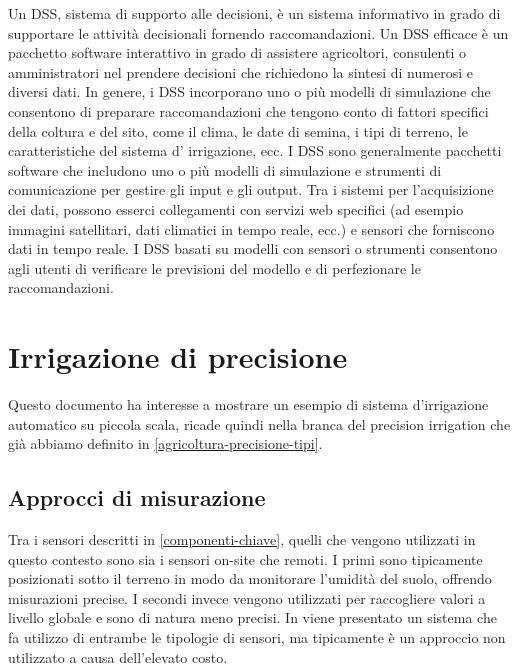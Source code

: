 \documentclass[12pt,a4paper,openright,twoside]{book}
\begin{document}
Un \ac{DSS}, sistema di supporto alle decisioni, è un sistema informativo in grado di supportare le attività decisionali fornendo raccomandazioni. Un \ac{DSS} efficace è un pacchetto software interattivo in grado di assistere agricoltori, consulenti o amministratori nel prendere decisioni che richiedono la sintesi di numerosi e diversi dati. In genere, i DSS incorporano uno o più modelli di simulazione che consentono di preparare raccomandazioni che tengono conto di fattori specifici della coltura e del sito, come il clima, le date di semina, i tipi di terreno, le caratteristiche del sistema d' irrigazione, ecc. I DSS sono generalmente pacchetti software che includono uno o più modelli di simulazione e strumenti di comunicazione per gestire gli input e gli output. Tra i sistemi per l'acquisizione dei dati, possono esserci collegamenti con servizi web specifici (ad esempio immagini satellitari, dati climatici in tempo reale, ecc.) e sensori che forniscono dati in tempo reale. I DSS basati su modelli con sensori o strumenti consentono agli utenti di verificare le previsioni del modello e di perfezionare le raccomandazioni\cite{GALLARDO2020106209}.
\newpage

\section{Irrigazione di precisione}
\label{irrigazione-di-precisione}

Questo documento ha interesse a mostrare un esempio di sistema d'irrigazione automatico su piccola scala, ricade quindi nella branca del precision irrigation che già abbiamo definito in \cref{agricoltura-precisione-tipi}.




\subsection{Approcci di misurazione}\label{approcci-misurazione}

Tra i sensori descritti in \cref{componenti-chiave}, quelli che vengono utilizzati in questo contesto sono sia i sensori on-site che remoti.
I primi sono tipicamente posizionati sotto il terreno in modo da monitorare l'umidità del suolo, offrendo misurazioni precise.
I secondi invece vengono utilizzati per raccogliere valori a livello globale e sono di natura meno precisi.
In  viene presentato un sistema che fa utilizzo di entrambe le tipologie di sensori, ma tipicamente è un approccio non utilizzato a causa dell'elevato costo.
\end{document}
